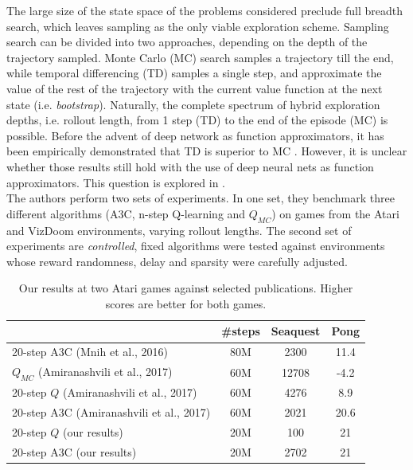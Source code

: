 \documentclass{article}
\begin{document}
The large size of the state space of the problems considered preclude full breadth
search, which leaves sampling as the only viable exploration scheme. Sampling
search can be divided into two approaches, depending on the depth of the trajectory
sampled. Monte Carlo (MC) search samples a trajectory till the end, while temporal
differencing (TD) samples a single step, and approximate the value of the rest of the
trajectory with the current value function at the next state (i.e. \emph{bootstrap}).
Naturally, the complete spectrum of hybrid exploration depths, i.e. rollout length,
from 1 step (TD) to the end of the episode (MC) is possible.
Before the advent of deep network as function approximators, it has been empirically
demonstrated that TD is superior to MC \citep{sutton1995}. However, it is unclear
whether those results still hold with the use of deep neural nets as function approximators.
This question is explored in \citep{amiranashvili2018analyzing}. \\

The authors perform two sets of experiments. In one set, they benchmark three different
algorithms (A3C, n-step Q-learning and $Q_{MC}$) on games from the Atari and VizDoom environments,
varying rollout lengths. The second set of experiments are \emph{controlled}, fixed algorithms
were tested against environments whose reward randomness, delay and sparsity were
carefully adjusted.\\

\begin{table}[H]
\centering
\label{table1}
    \begin{tabular}{@{}l|c|cc}
    \toprule
                                             & \#steps  & Seaquest  & Pong  \\ \midrule
    20-step A3C (Mnih et al., 2016)          & 80M      & 2300      & 11.4  \\ \midrule
    $Q_{MC}$ (Amiranashvili et al., 2017)    & 60M      & 12708     & -4.2  \\
    20-step $Q$ (Amiranashvili et al., 2017) & 60M      & 4276      & 8.9   \\
    20-step A3C (Amiranashvili et al., 2017) & 60M      & 2021      & 20.6  \\ \midrule
    20-step $Q$ (our results)                & 20M      & 100       & 21    \\
    20-step A3C (our results)                & 20M      & 2702      & 21    \\ \bottomrule
    \end{tabular}
\caption{Our results at two Atari games against selected publications. Higher scores are better for both games.}
\end{table}
\end{document}
